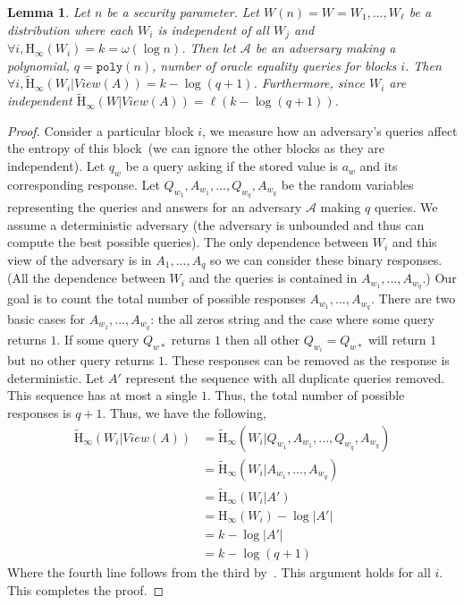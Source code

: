 \documentclass[11pt]{article}
\newcommand{\consref}[1]{\mbox{Construction~\ref{#1}}}
\newcommand{\poly}{\ensuremath{\mathtt{poly}}\xspace}
\newcommand{\Hoo}{\mathrm{H}_\infty}
\newcommand{\Hav}{\tilde{\mathrm{H}}_\infty}
\newtheorem{lemma}[theorem]{Lemma}
\begin{document}
\begin{lemma}
\label{lem:blocks unguessable after queries}
Let $n$ be a security parameter.  Let $W(n) = W = W_1,..., W_\ell$ be a distribution where each $W_i$ is independent of all $W_j$ and $\forall i, \Hoo(W_i) = k = \omega(\log n)$.  Then let $\mathcal{A}$ be an adversary making a polynomial, $q = \poly(n)$, number of oracle equality queries for blocks $i$.  %
Then $\forall i, \Hav(W_i | View(A))  = k- \log (q+1)$.  Furthermore, since $W_i$ are independent $\Hav(W | View(A))= \ell (k-\log (q+1))$.
\end{lemma}
\begin{proof}
Consider a particular block $i$, we measure how an adversary's queries affect the entropy of this block~(we can ignore the other blocks as they are independent).  
Let $q_w$ be a query asking if the stored value is $a_w$ and its corresponding response.  
Let $Q_{w_1},A_{w_1},..., Q_{w_q}, A_{w_q}$ be the random variables representing the queries and answers for an  adversary $\mathcal{A}$ making $q$ queries.  We assume a deterministic adversary (the adversary is unbounded and thus can compute the best possible queries).  The only dependence between $W_i$ and this view of the adversary is in $A_1,..., A_q$ so we can consider these binary responses.  (All the dependence between $W_i$ and the queries is contained in $A_{w_1},..., A_{w_q}$.)  Our goal is to count the total number of possible responses $A_{w_1},..., A_{w_q}$.  There are two basic cases for $A_{w_1},..., A_{w_q}$: the all zeros string and the case where some query returns $1$.  If some query $Q_{w*}$ returns $1$ then all other $Q_{w_i} = Q_{w*}$ will return $1$ but no other query returns $1$.  These responses can be removed as the response is deterministic.  Let $A'$ represent the sequence with all duplicate queries removed.  This sequence has at most a single $1$.  Thus, the total number of possible responses is $q+1$.  Thus, we have the following,
\begin{align*}
\Hav(W_i | View(A)) &= \Hav(W_i| Q_{w_1}, A_{w_1},..., Q_{w_q}, A_{w_q})\\
&=\Hav(W_i | A_{w_1},..., A_{w_q})\\
&=\Hav(W_i |A') \\
&=\Hoo(W_i) - \log |A'|\\
&=k - \log |A'|\\
&=k - \log (q+1)
\end{align*}
Where the fourth line follows from the third by~\cite[Lemma 2.2]{DBLP:journals/siamcomp/DodisORS08}.
This argument holds for all $i$.  This completes the proof.
\end{proof}
\end{document}
